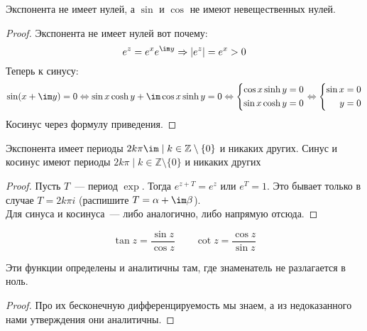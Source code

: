 \documentclass{article}
\begin{document}
    \begin{property}
        Экспонента не имеет нулей, а $\sin$ и $\cos$ не имеют невещественных нулей.
    \end{property}
    \begin{proof}
        Экспонента не имеет нулей вот почему:
        $$
        e^z=e^xe^{\im y}\Rightarrow|e^z|=e^x>0
        $$
        Теперь к синусу:
        \[
        \sin(x+\im y)=0\Leftrightarrow\sin x\cosh y+\im\cos x\sinh y=0\Leftrightarrow\left\{\begin{aligned}
            \cos x\sinh y&=0\\
            \sin x\cosh y&=0
        \end{aligned}\right.\Leftrightarrow\left\{\begin{aligned}
            \sin x&=0\\
            y&=0
        \end{aligned}\right.
        \]
        Косинус через формулу приведения.
    \end{proof}
    \begin{property}
        Экспонента имеет периоды $2k\pi\im\mid k\in\mathbb Z\setminus\{0\}$ и никаких других. Синус и косинус имеют периоды $2k\pi\mid k\in\mathbb Z\setminus\{0\}$ и никаких других
    \end{property}
    \begin{proof}
        Пусть $T$~--- период $\exp$. Тогда $e^{z+T}=e^z$ или $e^T=1$. Это бывает только в случае $T=2k\pi i$ (распишите $T=\alpha+\im\beta$).\\
        Для синуса и косинуса~--- либо аналогично, либо напрямую отсюда.
    \end{proof}
    \begin{definition}
        $$\tan z=\frac{\sin z}{\cos z}\qquad\cot z=\frac{\cos z}{\sin z}$$
    \end{definition}
    \begin{property}
        Эти функции определены и аналитичны там, где знаменатель не разлагается в ноль.
    \end{property}
    \begin{proof}
        Про их бесконечную дифференцируемость мы знаем, а из недоказанного нами утверждения они аналитичны.
    \end{proof}
\end{document}
